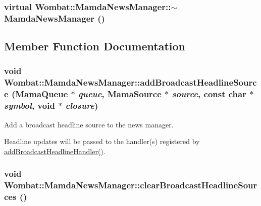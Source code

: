 \hypertarget{classWombat_1_1MamdaNewsManager_072a71cbba7a316cf286a335f2b50c1f}{
\subsubsection[$\sim$MamdaNewsManager]{\setlength{\rightskip}{0pt plus 5cm}virtual Wombat::Mamda\-News\-Manager::$\sim$Mamda\-News\-Manager ()}}
\label{classWombat_1_1MamdaNewsManager_072a71cbba7a316cf286a335f2b50c1f}




\subsection{Member Function Documentation}
\hypertarget{classWombat_1_1MamdaNewsManager_5f34ce74810c8d0099dea570818e2801}{
\subsubsection[addBroadcastHeadlineSource]{\setlength{\rightskip}{0pt plus 5cm}void Wombat::Mamda\-News\-Manager::add\-Broadcast\-Headline\-Source (Mama\-Queue $\ast$ {\em queue}, Mama\-Source $\ast$ {\em source}, const char $\ast$ {\em symbol}, void $\ast$ {\em closure})}}
\label{classWombat_1_1MamdaNewsManager_5f34ce74810c8d0099dea570818e2801}


Add a broadcast headline source to the news manager. 

Headline updates will be passed to the handler(s) registered by \hyperlink{classWombat_1_1MamdaNewsManager_9fc593b6b72946a4a62cfba27412417d}{add\-Broadcast\-Headline\-Handler()}. \hypertarget{classWombat_1_1MamdaNewsManager_d0099a7dfa218322f47bfc7228a1b221}{
\subsubsection[clearBroadcastHeadlineSources]{\setlength{\rightskip}{0pt plus 5cm}void Wombat::Mamda\-News\-Manager::clear\-Broadcast\-Headline\-Sources ()}}
\label{classWombat_1_1MamdaNewsManager_d0099a7dfa218322f47bfc7228a1b221}


